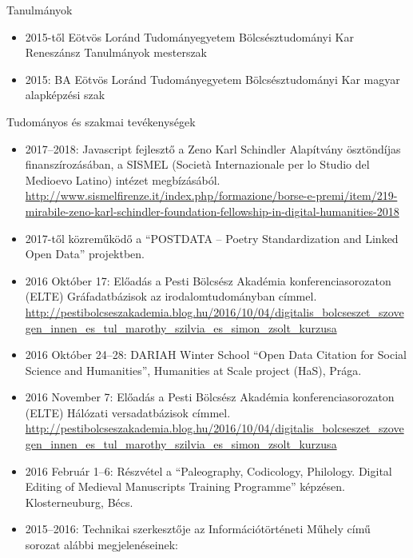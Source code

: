 \vspace{1em}

Tanulmányok

\begin{itemize}
  \item{2015-től Eötvös Loránd Tudományegyetem Bölcsésztudományi Kar Reneszánsz Tanulmányok mesterszak}
  \item{2015: BA Eötvös Loránd Tudományegyetem Bölcsésztudományi Kar magyar alapképzési szak}
\end{itemize}

Tudományos és szakmai tevékenységek

\begin{itemize}
  \item{ 
    2017--2018: Javascript fejlesztő a Zeno Karl Schindler Alapítvány ösztöndíjas finanszírozásában, a SISMEL (Società Internazionale per lo Studio del Medioevo Latino) intézet megbízásából. 
    \url{http://www.sismelfirenze.it/index.php/formazione/borse-e-premi/item/219-mirabile-zeno-karl-schindler-foundation-fellowship-in-digital-humanities-2018} 
  }
  \item{2017-től közreműködő a  ``POSTDATA – Poetry Standardization and Linked
    Open Data'' projektben. }
  \item{2016 Október 17: Előadás a Pesti Bölcsész Akadémia konferenciasorozaton (ELTE)
    Gráfadatbázisok az irodalomtudományban címmel.\\
    \url{http://pestibolcseszakademia.blog.hu/2016/10/04/digitalis\_bolcseszet\_szovegen\_innen\_es\_tul\_marothy\_szilvia\_es\_simon\_zsolt\_kurzusa}
  }
  \item{2016 Október 24–28: DARIAH Winter School ``Open Data
    Citation for Social Science and Humanities'', Humanities at Scale project (HaS),
    Prága. }
  \item{2016 November 7: Előadás a Pesti Bölcsész Akadémia konferenciasorozaton (ELTE) Hálózati versadatbázisok címmel.\\
    \url{http://pestibolcseszakademia.blog.hu/2016/10/04/digitalis\_bolcseszet\_szovegen\_innen\_es\_tul\_marothy\_szilvia\_es\_simon\_zsolt\_kurzusa}
        }
  \item{2016 Február 1–6: Részvétel a ``Paleography, Codicology, Philology.
       Digital Editing of Medieval Manuscripts Training Programme'' képzésen.
       Klosterneuburg, Bécs. }
  \item{2015–2016: Technikai szerkesztője az Információtörténeti Műhely című sorozat alábbi megjelenéseinek: }
    \begin{itemize}

\end{itemize}
\end{itemize}
